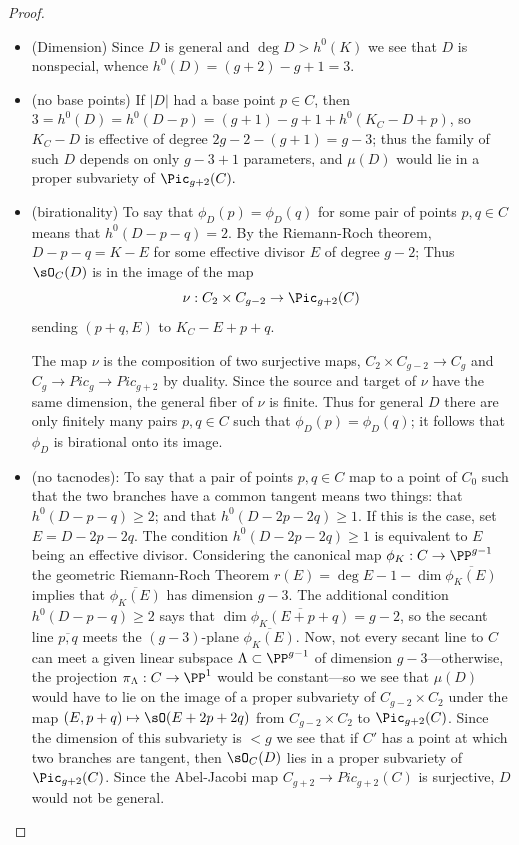 \begin{proof}
\begin{itemize}

\item (Dimension) Since $D$ is general and $\deg D > h^{0}(K)$ we see that $D$ is nonspecial, whence $h^0(D) = (g+2)-g+1 = 3.$

\item (no base points) If $|D|$ had a base point $p\in C$, then $3=h^0(D) = h^0(D-p) = (g+1)-g+1+h^0(K_C-D+p)$,
so $K_C-D$ is effective of degree $2g-2-(g+1) =g-3$; thus the family of such $D$ depends on only $g-3+1$ parameters,
and $\mu(D)$ would lie in a proper subvariety of $\Pic_{g+2}(C).$

\item (birationality)
 To say that $\phi_D(p) = \phi_D(q)$ for some pair of points $p, q \in C$   means that $h^0(D-p-q) = 2$. By the Riemann-Roch
 theorem, $D-p-q = K-E$ for some effective divisor $E$ of degree $g-2$; Thus $\sO_C(D)$ is in the image of the map
$$
\nu : C_2 \times C_{g-2} \to \Pic_{g+2}(C)
$$
sending $(p+q, E)$ to $K_C - E + p + q$. 

The map $\nu$ is 
the composition of two surjective maps, $C_2 \times C_{g-2} \to C_g$ and $C_g\to Pic_g \to Pic_{g+2}$ by duality. Since the source and target of $\nu$ have the same dimension, the general fiber of $\nu$ is finite. Thus for general $D$  there are only finitely many pairs $p, q \in C$ such that $\phi_D(p) = \phi_D(q)$; it follows that $\phi_D$ is birational onto its image.


\item (no tacnodes):  To say that a pair of points $p, q \in C$ map to a point of $C_0$ such that the 
two branches have a common tangent means two things: that $h^0(D-p-q) \geq 2$; and that $h^0(D-2p-2q) \geq 1$. If this is the case, set $E = D - 2p - 2q$.  The condition $h^0(D-2p-2q) \geq 1$ is equivalent to  $E$ being an effective divisor. Considering the canonical map $\phi_K: C\to \PP^{g-1}$ 
the geometric Riemann-Roch Theorem $r(E) = \deg E -1-\dim\overline{\phi_K(E)}$ implies that $\overline {\phi_K(E)}$ has dimension $g-3$. The additional condition $h^0(D-p-q) \geq 2$ says that $\dim\overline{\phi_K(E+p+q)} = g-2$,
so the secant line $\overline{p,q}$ meets the $(g-3)$-plane $\overline{\phi_K(E)}$. Now, not every secant line to $C$ can meet a given linear subspace $\Lambda \subset \PP^{g-1}$ of dimension $g-3$---otherwise, the projection $\pi_\Lambda : C \to \PP^1$ would be constant---so we see that $\mu(D)$ would have to lie on the image of a proper subvariety of $C_{g-2} \times C_2$ under the map $(E, p+q) \mapsto \sO(E+2p+2q)$ from $C_{g-2} \times C_2$ to $\Pic_{g+2}(C)$.
Since the dimension of this subvariety is $<g$ we see that if $C'$ has
a point at which two branches are tangent, then $\sO_C(D)$ lies in a proper subvariety of $\Pic_{g+2}(C)$. Since
the Abel-Jacobi map $C_{g+2} \to Pic_{g+2}(C)$ is surjective,
 $D$ would not be general. 
 


\end{itemize}
\end{proof}
